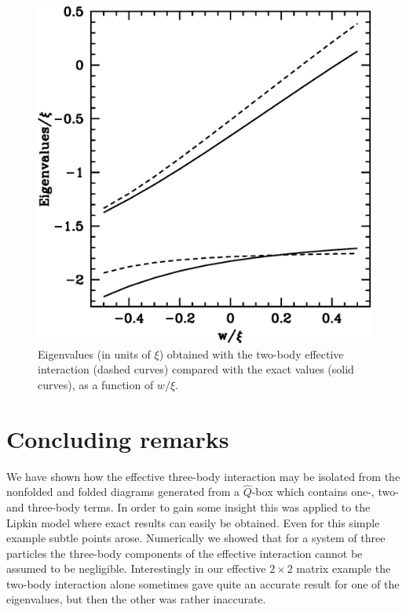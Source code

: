 \documentclass[prc,aps,amsmath,amssymb,preprintnumbers,showpacs,twocolumn]{revtex4}
\begin{document}
%
\begin{figure}[t]
 \includegraphics[width=7truecm]{fig7.eps}
\caption{Eigenvalues (in units of $\xi$) obtained with the two-body
effective interaction (dashed curves) compared with the exact values
(solid curves), as a function of $w/\xi$.} \label{f7}
\end{figure}
%


\section{Concluding remarks\label{seciv}}
 
We have shown how the effective three-body interaction may be isolated 
from the nonfolded and folded diagrams generated from a $\hat{Q}$-box 
which contains one-, two- and three-body terms. In order to gain some 
insight this was applied to the Lipkin model where exact results can easily 
be obtained. Even for this simple example subtle points arose.
Numerically we showed that for a system of three particles the
three-body components of the effective interaction cannot be assumed to be
negligible. Interestingly in our effective $2\times2$ matrix example
the two-body interaction alone sometimes gave quite an accurate 
result for one of the eigenvalues, but then the other was rather inaccurate.
\end{document}
